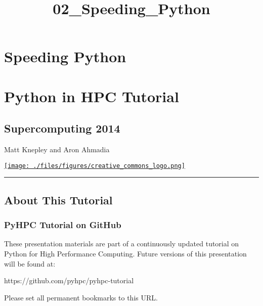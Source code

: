 \documentclass{article}
\title{02\_Speeding\_Python}
\begin{document}
    
    
    \maketitle
    
    

    
    \section{Speeding Python}\label{speeding-python}

\section{Python in HPC Tutorial}\label{python-in-hpc-tutorial}

\subsection{Supercomputing 2014}\label{supercomputing-2014}

Matt Knepley and Aron Ahmadia

\href{http://creativecommons.org/licenses/by/3.0/deed.en_US}{\texttt{[image: ./files/figures/creative\_commons\_logo.png]}}

    \begin{center}\rule{3in}{0.4pt}\end{center}

\subsection{About This Tutorial}\label{about-this-tutorial}

\subsubsection{PyHPC Tutorial on GitHub}\label{pyhpc-tutorial-on-github}

These presentation materials are part of a continuously updated tutorial
on Python for High Performance Computing. Future versions of this
presentation will be found at:

https://github.com/pyhpc/pyhpc-tutorial

Please set all permanent bookmarks to this URL.

\subsubsection{}\label{section}
\end{document}
